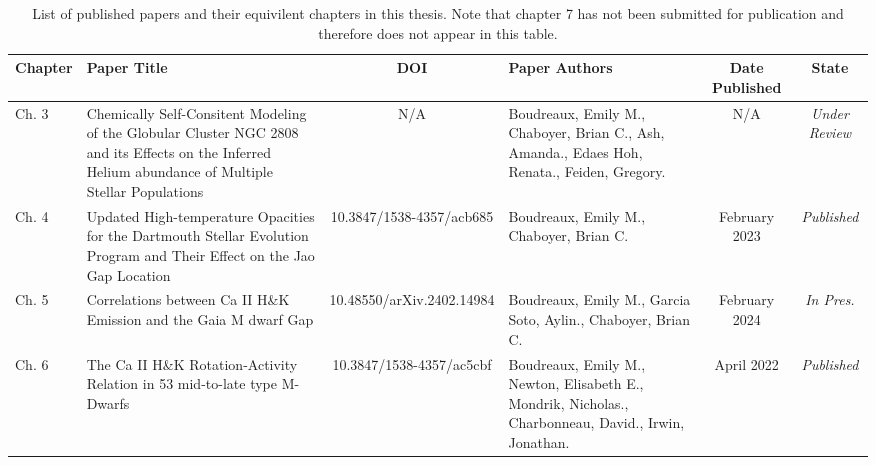 \begin{table}
\centering
\scriptsize
  \begin{tabular}{l p{3cm} c p{2cm} c c}
    \hline
    \rowcolor{gray!50}
    Chapter & Paper Title & DOI & Paper Authors & Date Published & State\\
    \hline
    \hline
    Ch. 3 &  Chemically Self-Consitent Modeling of the Globular Cluster NGC 2808 and its Effects on the Inferred Helium abundance of Multiple Stellar Populations & N/A & Boudreaux, Emily M., Chaboyer, Brian C., Ash, Amanda., Edaes Hoh, Renata., Feiden, Gregory.& N/A & {\em Under Review} \\
    Ch. 4 & Updated High-temperature Opacities for the Dartmouth Stellar Evolution Program and Their Effect on the Jao Gap Location & 10.3847/1538-4357/acb685 & Boudreaux, Emily M., Chaboyer, Brian C. & February 2023 & {\em Published} \\
    Ch. 5 & Correlations between Ca II H\&K Emission and the Gaia M dwarf Gap & 10.48550/arXiv.2402.14984 & Boudreaux, Emily M., Garcia Soto, Aylin., Chaboyer, Brian C. & February 2024 & {\em In Pres.} \\
    Ch. 6 & The Ca II H\&K Rotation-Activity Relation in 53 mid-to-late type M-Dwarfs & 10.3847/1538-4357/ac5cbf & Boudreaux, Emily M., Newton, Elisabeth E., Mondrik, Nicholas., Charbonneau, David., Irwin, Jonathan. & April 2022 & {\em Published}
  \end{tabular}
  \caption{List of published papers and their equivilent chapters in this thesis. Note that chapter 7 has not been submitted for publication and therefore does not appear in this table.}
  \label{tab:publications}
\end{table}
